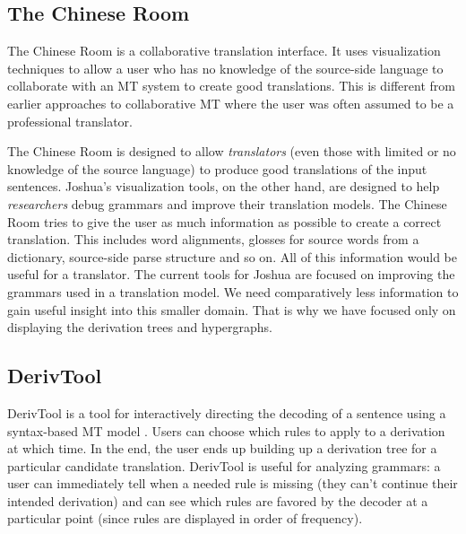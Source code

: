 \documentclass[nologo]{pbml}
\begin{document}
\subsection{The Chinese Room}

The Chinese Room \cite{albrecht-hwa-marai:2009:EACL} is a collaborative translation interface. It uses visualization
techniques to allow a user who has no knowledge of the source-side language to
collaborate with an MT system to create good translations. This is different
from earlier approaches to collaborative MT where the user was often assumed to
 be a professional translator. 

The Chinese
Room is designed to allow {\em translators} (even those with limited or no
knowledge of the source language) to produce good translations of the input
sentences. Joshua's visualization tools, on the other hand, are designed to
help {\em researchers} debug grammars and improve their translation models.
The Chinese Room tries to give the user as much information as possible to
create a correct translation. This includes word alignments, glosses for
source words from a dictionary, source-side parse structure and so on. All
of this information would be useful for a translator.
The current tools for Joshua are focused on improving
the grammars used in a translation model. We need comparatively less 
information to gain useful insight into this smaller domain. That is why we
have focused only on displaying the derivation trees and hypergraphs.

\subsection{DerivTool}

DerivTool is a tool for interactively directing the decoding of a sentence
using a syntax-based MT model \cite{deneefe-knight-chan:2005:PosterDemo}. Users can choose which
rules to apply to a derivation at which time. In the end, the user ends up
building up a derivation tree for a particular candidate translation. DerivTool
is useful for analyzing grammars: a user can immediately tell when a needed
rule is missing (they can't continue their intended derivation) and can see
which rules are favored by the decoder at a particular point (since rules are
displayed in order of frequency).
\end{document}
